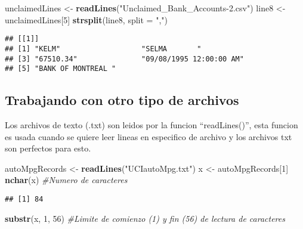 \documentclass[]{article}
\newenvironment{Shaded}{\begin{snugshade}}{\end{snugshade}}
\newcommand{\CommentTok}[1]{\textcolor[rgb]{0.56,0.35,0.01}{\textit{#1}}}
\newcommand{\DataTypeTok}[1]{\textcolor[rgb]{0.13,0.29,0.53}{#1}}
\newcommand{\DecValTok}[1]{\textcolor[rgb]{0.00,0.00,0.81}{#1}}
\newcommand{\KeywordTok}[1]{\textcolor[rgb]{0.13,0.29,0.53}{\textbf{#1}}}
\newcommand{\NormalTok}[1]{#1}
\newcommand{\StringTok}[1]{\textcolor[rgb]{0.31,0.60,0.02}{#1}}
\begin{document}
\begin{Shaded}
\begin{Highlighting}[]
\NormalTok{unclaimedLines <-}\StringTok{ }\KeywordTok{readLines}\NormalTok{(}\StringTok{"Unclaimed_Bank_Accounts-2.csv"}\NormalTok{)}
\NormalTok{line8 <-}\StringTok{ }\NormalTok{unclaimedLines[}\DecValTok{5}\NormalTok{]}
\KeywordTok{strsplit}\NormalTok{(line8, }\DataTypeTok{split =} \StringTok{","}\NormalTok{)}
\end{Highlighting}
\end{Shaded}

\begin{verbatim}
## [[1]]
## [1] "KELM"                   "SELMA       "          
## [3] "67510.34"               "09/08/1995 12:00:00 AM"
## [5] "BANK OF MONTREAL "
\end{verbatim}

\hypertarget{trabajando-con-otro-tipo-de-archivos}{%
\subsection{Trabajando con otro tipo de
archivos}\label{trabajando-con-otro-tipo-de-archivos}}

Los archivos de texto (.txt) son leidos por la funcion ``readLines()'',
esta funcion es usada cuando se quiere leer lineas en especifico de
archivo y los archivos txt son perfectos para esto.

\begin{Shaded}
\begin{Highlighting}[]
\NormalTok{autoMpgRecords <-}\StringTok{ }\KeywordTok{readLines}\NormalTok{(}\StringTok{"UCIautoMpg.txt"}\NormalTok{)}
\NormalTok{x <-}\StringTok{ }\NormalTok{autoMpgRecords[}\DecValTok{1}\NormalTok{]}
\KeywordTok{nchar}\NormalTok{(x)  }\CommentTok{#Numero de caracteres}
\end{Highlighting}
\end{Shaded}

\begin{verbatim}
## [1] 84
\end{verbatim}

\begin{Shaded}
\begin{Highlighting}[]
\KeywordTok{substr}\NormalTok{(x, }\DecValTok{1}\NormalTok{, }\DecValTok{56}\NormalTok{) }\CommentTok{#Limite de comienzo (1) y fin (56) de lectura de caracteres}
\end{Highlighting}
\end{Shaded}
\end{document}
